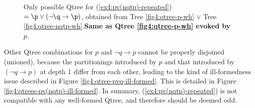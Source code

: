 \begin{figure}[H]\setlength{\fboxsep}{2pt}
	\centering
	\scalebox{1}{
		\begin{forest}
			[CS [{\fbox{$\p$}}][{$\q$}][{$\r$}][...]]
		\end{forest}
	}
	\caption[]{Only possible Qtree for (\ref{ex4:pv(nqtp)-repeated}) $= \p \vee (\neg \q \rightarrow \p)$, obtained from Tree \ref{fig4:qtree-p-wh} $\vee$ Tree \ref{fig4:qtree-nqtp-wh}.\textbf{Same as Qtree \ref{fig4:qtree-p-wh} evoked by $p$}.}\label{fig4:qtree-pv(nqtp)}
\end{figure}

Other Qtree combinations for $p$ and $\neg q \rightarrow p$ cannot be properly disjoined (unioned), because the partitionings introduced by $p$ and that introduced by $(\neg q \rightarrow p)$ at depth 1 differ from each other, leading to the kind of ill-formedness issue described in Figure \ref{fig4:qtree-pvq-ill-formed}. This is detailed in Figure \ref{fig4:qtrees-pv(nqtp)-ill-formed}. In summary, (\ref{ex4:pv(nqtp)-repeated}) is not compatible with any well-formed Qtree, and therefore should be deemed odd.

